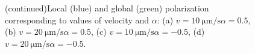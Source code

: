 \documentclass[../../master_thesis_np.tex]{subfiles}
\begin{document}
		\begin{figure}
			\centering
			\ContinuedFloat
			\caption{(continued)Local (blue) and global (green) polarization corresponding to values of velocity and $\alpha$: (a) $v = \SI{10}{\um \per \second} \alpha = 0.5$, (b) $v = \SI{20}{\um \per \second} \alpha = 0.5$, (c) $v = \SI{10}{\um \per \second} \alpha = -0.5$, (d) $v = \SI{20}{\um \per \second} \alpha = -0.5$.}
			\label{fig:lj_velocity_pol}
		\end{figure}
		
\end{document}
